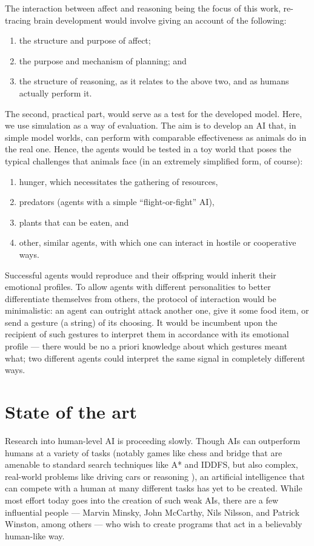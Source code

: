 \documentclass[bibliography=totoc ]{scrartcl}
\begin{document}
The interaction between affect and reasoning being the focus of this work, re-tracing brain development would involve giving an account of the following:

\begin{enumerate}
	\item the structure and purpose of affect;
	\item the purpose and mechanism of planning; and
	\item the structure of reasoning, as it relates to the above two, and as humans actually perform it.
\end{enumerate}

The second, practical part, would serve as a test for the developed model. Here, we use simulation as a way of evaluation. The aim is to develop an AI that, in simple model worlds, can perform with comparable effectiveness as animals do in the real one. Hence, the agents would be tested in a toy world that poses the typical challenges that animals face (in an extremely simplified form, of course):

\begin{enumerate}
	\item hunger, which necessitates the gathering of resources,
	\item predators (agents with a simple ``flight-or-fight'' AI),
	\item plants that can be eaten, and
	\item other, similar agents, with which one can interact in hostile or cooperative ways.
\end{enumerate}
Successful agents would reproduce and their offspring would inherit their emotional profiles. To allow agents with different personalities to better differentiate themselves from others, the protocol of interaction would be minimalistic: an agent can outright attack another one, give it some food item, or send a gesture (a string) of its choosing. It would be incumbent upon the recipient of such gestures to interpret them in accordance with its emotional profile --- there would be no a priori knowledge about which gestures meant what; two different agents could interpret the same signal in completely different ways.

\section{State of the art}

Research into human-level AI is proceeding slowly. Though AIs can outperform humans at a variety of tasks (notably games like chess and bridge \cite{Schaeffer00} that are amenable to standard search techniques like A* and IDDFS, but also complex, real-world problems like driving cars \cite{googleCar, googleCar2} or reasoning \cite{asp1, acthex}), an artificial intelligence that can compete with a human at many different tasks has yet to be created. While most effort today goes into the creation of such weak AIs, there are a few influential people --- Marvin Minsky, John McCarthy, Nils Nilsson, and Patrick Winston, among others \cite[p. 27]{norvig} --- who wish to create programs that act in a believably human-like way.
\end{document}
